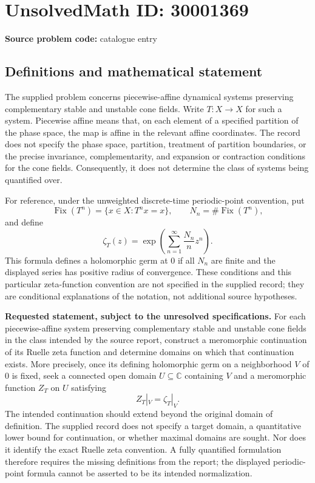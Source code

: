 \documentclass[11pt]{article}
\newcommand{\C}{\mathbb{C}}
\begin{document}
\section*{UnsolvedMath ID: 30001369}
\textbf{Source problem code:} catalogue entry
\subsection{Definitions and mathematical statement}
The supplied problem concerns piecewise-affine dynamical systems preserving complementary stable and unstable cone fields. Write \(T\colon X\to X\) for such a system. Piecewise affine means that, on each element of a specified partition of the phase space, the map is affine in the relevant affine coordinates. The record does not specify the phase space, partition, treatment of partition boundaries, or the precise invariance, complementarity, and expansion or contraction conditions for the cone fields. Consequently, it does not determine the class of systems being quantified over.

For reference, under the unweighted discrete-time periodic-point convention, put
\[
\operatorname{Fix}(T^n)=\{x\in X:T^n x=x\},\qquad N_n=\#\operatorname{Fix}(T^n),
\]
and define
\[
\zeta_T(z)=\exp\!\left(\sum_{n=1}^{\infty}\frac{N_n}{n}z^n\right).
\]
This formula defines a holomorphic germ at \(0\) if all \(N_n\) are finite and the displayed series has positive radius of convergence. These conditions and this particular zeta-function convention are not specified in the supplied record; they are conditional explanations of the notation, not additional source hypotheses.

\textbf{Requested statement, subject to the unresolved specifications.} For each piecewise-affine system preserving complementary stable and unstable cone fields in the class intended by the source report, construct a meromorphic continuation of its Ruelle zeta function and determine domains on which that continuation exists. More precisely, once its defining holomorphic germ on a neighborhood \(V\) of \(0\) is fixed, seek a connected open domain \(U\subseteq\C\) containing \(V\) and a meromorphic function \(Z_T\) on \(U\) satisfying
\[
Z_T|_V=\zeta_T|_V.
\]
The intended continuation should extend beyond the original domain of definition. The supplied record does not specify a target domain, a quantitative lower bound for continuation, or whether maximal domains are sought. Nor does it identify the exact Ruelle zeta convention. A fully quantified formulation therefore requires the missing definitions from the report; the displayed periodic-point formula cannot be asserted to be its intended normalization.
\end{document}
